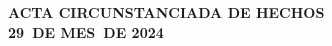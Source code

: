 \documentclass[letterpaper,12pt]{article}
\newcommand{\dia}{29}
\newcommand{\mes}{MES}
\newcommand{\anno}{2024}
\begin{document}
\begin{center}
    \textbf{\Large ACTA CIRCUNSTANCIADA DE HECHOS}\\
    \vspace{12pt}
    \textbf{\dia\ DE \mes\ DE \anno}\\
    \vspace{12pt}
\end{center}







\end{document}
